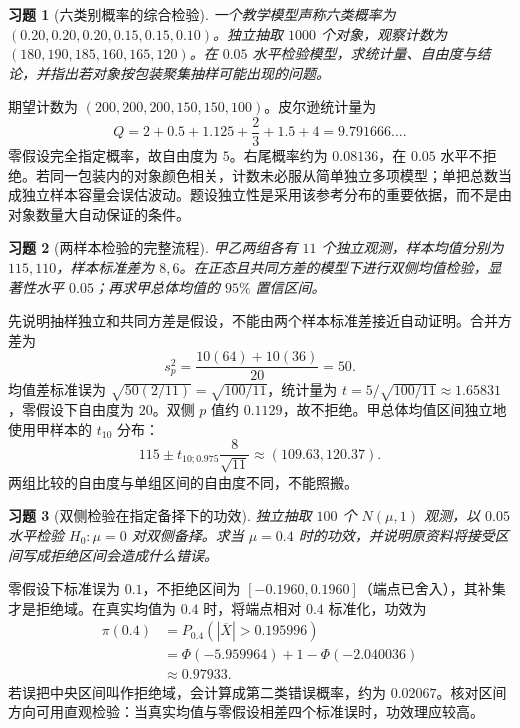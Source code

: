 \documentclass[12pt,fontset=fandol]{ctexart}
\newtheorem{exercise}{习题}[section]
\begin{document}
\begin{exercise}[六类别概率的综合检验]\label{q:M-F-8}
一个教学模型声称六类概率为 $(0.20,0.20,0.20,0.15,0.15,0.10)$。独立抽取 $1000$ 个对象，观察计数为 $(180,190,185,\allowbreak160,165,120)$。在 $0.05$ 水平检验模型，求统计量、自由度与结论，并指出若对象按包装聚集抽样可能出现的问题。\par{}
\end{exercise}

\begin{solve}\label{a:M-F-8}期望计数为 $(200,200,200,150,150,100)$。皮尔逊统计量为\[Q=2+0.5+1.125+\frac23+1.5+4=9.791666\ldots.\]零假设完全指定概率，故自由度为 $5$。右尾概率约为 $0.08136$，在 $0.05$ 水平不拒绝。若同一包装内的对象颜色相关，计数未必服从简单独立多项模型；单把总数当成独立样本容量会误估波动。题设独立性是采用该参考分布的重要依据，而不是由对象数量大自动保证的条件。\end{solve}

\begin{exercise}[两样本检验的完整流程]\label{q:M-F-9}
甲乙两组各有 $11$ 个独立观测，样本均值分别为 $115,110$，样本标准差为 $8,6$。在正态且共同方差的模型下进行双侧均值检验，显著性水平 $0.05$；再求甲总体均值的 $95\%$ 置信区间。\par{}
\end{exercise}

\begin{solve}\label{a:M-F-9}先说明抽样独立和共同方差是假设，不能由两个样本标准差接近自动证明。合并方差为\[s_p^2=\frac{10(64)+10(36)}{20}=50.\]均值差标准误为 $\sqrt{50(2/11)}=\sqrt{100/11}$，统计量为 $t=5/\sqrt{100/11}\approx1.65831$，零假设下自由度为 $20$。双侧 $p$ 值约 $0.1129$，故不拒绝。甲总体均值区间独立地使用甲样本的 $t_{10}$ 分布：\[115\pm t_{10;0.975}\frac8{\sqrt{11}}\approx(109.63,120.37).\]两组比较的自由度与单组区间的自由度不同，不能照搬。\end{solve}

\begin{exercise}[双侧检验在指定备择下的功效]\label{q:M-F-11}
独立抽取 $100$ 个 $N(\mu,1)$ 观测，以 $0.05$ 水平检验 $H_0:\mu=0$ 对双侧备择。求当 $\mu=0.4$ 时的功效，并说明原资料将接受区间写成拒绝区间会造成什么错误。\par{}
\end{exercise}

\begin{solve}\label{a:M-F-11}零假设下标准误为 $0.1$，不拒绝区间为 $[-0.1960,0.1960]$（端点已舍入），其补集才是拒绝域。在真实均值为 $0.4$ 时，将端点相对 $0.4$ 标准化，功效为\[\begin{aligned}\pi(0.4)&=P_{0.4}(|\overline X|>0.195996)\\&=\Phi(-5.959964)+1-\Phi(-2.040036)\\&\approx0.97933.\end{aligned}\]若误把中央区间叫作拒绝域，会计算成第二类错误概率，约为 $0.02067$。核对区间方向可用直观检验：当真实均值与零假设相差四个标准误时，功效理应较高。\end{solve}
\end{document}
